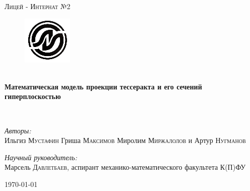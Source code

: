 \begin{titlepage}
\begin{center}
\textsc{\LARGE Лицей - Интернат №2}\\[1.5cm]

\begin{figure}
	\center
	\includegraphics[scale=0.8]{./li.png}
	\clearpage
\end{figure}


\selectfont
\HRule \\[0.4cm]
{ \huge \bfseries Математическая модель проекции тессеракта и его сечений гиперплоскостью\\[0.4cm] }

\HRule \\[1.5cm]

\noindent

\begin{minipage}{0.4\textwidth}
\begin{flushleft} \large
\emph{Авторы:}\\
Ильгиз \textsc{Мустафин} \newline
Гриша \textsc{Максимов} \newline %
Миролим \textsc{Миржалолов} 
и \newline
Артур \textsc{Нугманов} 
\end{flushleft}

\end{minipage}%
\begin{minipage}{0.4\textwidth}
\begin{flushright} \large
\emph{Научный руководитель:} \\
Марсель \textsc{Давлетбаев}, аспирант механико-математического факультета К(П)ФУ
\end{flushright}
\end{minipage}

\vfill

{\large \today}

\end{center}
\end{titlepage}
